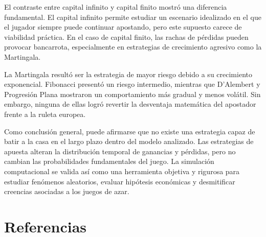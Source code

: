 \documentclass{article}
\begin{document}
El contraste entre capital infinito y capital finito mostró una diferencia fundamental. El capital infinito permite estudiar un escenario idealizado en el que el jugador siempre puede continuar apostando, pero este supuesto carece de viabilidad práctica. En el caso de capital finito, las rachas de pérdidas pueden provocar bancarrota, especialmente en estrategias de crecimiento agresivo como la Martingala.

La Martingala resultó ser la estrategia de mayor riesgo debido a su crecimiento exponencial. Fibonacci presentó un riesgo intermedio, mientras que D'Alembert y Progresión Plana mostraron un comportamiento más gradual y menos volátil. Sin embargo, ninguna de ellas logró revertir la desventaja matemática del apostador frente a la ruleta europea.

Como conclusión general, puede afirmarse que no existe una estrategia capaz de batir a la casa en el largo plazo dentro del modelo analizado. Las estrategias de apuesta alteran la distribución temporal de ganancias y pérdidas, pero no cambian las probabilidades fundamentales del juego. La simulación computacional se valida así como una herramienta objetiva y rigurosa para estudiar fenómenos aleatorios, evaluar hipótesis económicas y desmitificar creencias asociadas a los juegos de azar.

\newpage

\section{Referencias}
\end{document}
